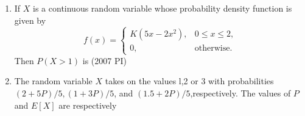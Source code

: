\begin{enumerate}[label=\thesubsection.\arabic*,ref=\thesubsection.\theenumi]
\begin{enumerate}
    \end{enumerate}
\item
If $X$ is a continuous random variable whose probability density function is given by
       \[
f(x) =
\begin{cases}
K(5x - 2x^2), & 0 \leq x \leq 2, \\
0, & \text{otherwise}.
\end{cases}
\]
 Then $P(X>1)$ is
            \hfill (2007 PI)
            \begin{enumerate}
            \end{enumerate}
            \item 
            The random variable $X$ takes on the values l,2 or 3 with probabilities $(2+5P)/5,(1+3P)/5$, and $(1.5+2P)/5$,respectively. The values of $P$ and $E[X]$ are respectively


\end{enumerate}
